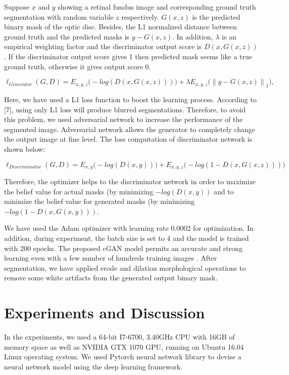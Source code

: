 \documentclass{IOS-Book-Article}
\newcommand\norm[1]{\left\lVert#1\right\rVert}
\begin{document}
Suppose $x$ and $y$ showing a retinal fundus image and corresponding ground truth segmentation with random variable $z$ respectively. $G(x, z)$ is the predicted binary mask of the optic disc. Besides, the L1 normalized distance between ground truth and the predicted masks is $y-G(x, z)$. In addition,  $\lambda$ is an empirical weighting factor and the discriminator output score is $D(x, G(x, z))$. If the discriminator output score gives 1 then predicted mask seems like a true ground truth, otherwise it gives output score 0. 

\begin{equation}
\ell_{Generator} (G,D) = E_{x,y,z} \big(-log (D(x,G(x,z)))\big)+ \lambda E_{x,y,z} \big(\norm{y-G(x,z)}_{1}\big), 
\end{equation}

Here, we have used a L1 loss function to boost the learning process. According to [7], using only L1 loss will produce blurred segmentations. Therefore, to avoid this problem, we used adversarial network to increase the performance of the segmented image. Adversarial network allows the generator to completely change the output image at fine level. 
The loss computation of discriminator network is shown below:

\begin{equation}
\ell_{Discriminator} (G,D) = E_{x,y} \big(-log (D(x,y))\big)+ E_{x,y,z} \big(-log (1-D(x,G(x,z)))\big)
\end{equation}

Therefore, the optimizer helps to the discriminator network in order to maximize the belief value for actual masks (by minimizing $-log (D(x, y))$ and to minimize the belief value for generated masks (by minimizing $-log (1-D(x, G(x, {y})))$.

We have used the Adam \cite{kingma2014adam} optimizer with learning rate 0.0002 for optimization. In addition, during experiment, the batch size is set to 4 and the model is trained with 200 epochs. The proposed cGAN model permits an accurate and strong learning even with a few number of hundreds training images . After segmentation, we have applied erode and dilation morphological operations to remove some white artifacts from the generated output binary mask.

\section{Experiments and Discussion}
In the experiments, we used a 64-bit I7-6700, 3.40GHz CPU with 16GB of memory space as well as NVIDIA GTX 1070 GPU, running on Ubuntu 16.04 Linux operating system. We used Pytorch \cite{paskze2017tensors} neural network library to devise a neural network model using the deep learning framework.
\end{document}
